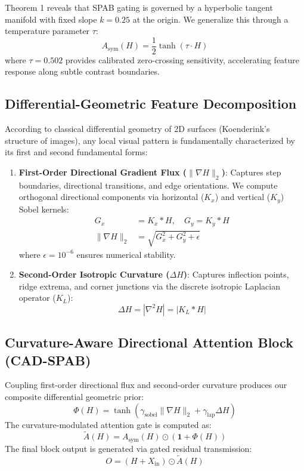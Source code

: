 \documentclass[conference]{IEEEtran}
\begin{document}
Theorem 1 reveals that SPAB gating is governed by a hyperbolic tangent manifold with fixed slope $k = 0.25$ at the origin. We generalize this through a temperature parameter $\tau$:
\begin{equation}
A_{\text{sym}}(H) = \frac{1}{2}\tanh(\tau \cdot H)
\label{eq:temp_sym}
\end{equation}
where $\tau = 0.502$ provides calibrated zero-crossing sensitivity, accelerating feature response along subtle contrast boundaries.

\subsection{Differential-Geometric Feature Decomposition}
According to classical differential geometry of 2D surfaces (Koenderink's structure of images), any local visual pattern is fundamentally characterized by its first and second fundamental forms:
\begin{enumerate}
    \item \textbf{First-Order Directional Gradient Flux ($\|\nabla H\|_2$)}: Captures step boundaries, directional transitions, and edge orientations. We compute orthogonal directional components via horizontal ($K_x$) and vertical ($K_y$) Sobel kernels:
    \begin{align}
    G_x &= K_x * H, \quad G_y = K_y * H \\
    \|\nabla H\|_2 &= \sqrt{G_x^2 + G_y^2 + \epsilon}
    \end{align}
    where $\epsilon = 10^{-6}$ ensures numerical stability.
    \item \textbf{Second-Order Isotropic Curvature ($\Delta H$)}: Captures inflection points, ridge extrema, and corner junctions via the discrete isotropic Laplacian operator ($K_L$):
    \begin{equation}
    \Delta H = |\nabla^2 H| = |K_L * H|
    \end{equation}
\end{enumerate}

\subsection{Curvature-Aware Directional Attention Block (CAD-SPAB)}
Coupling first-order directional flux and second-order curvature produces our composite differential geometric prior:
\begin{equation}
\Phi(H) = \tanh\left(\gamma_{\text{sobel}} \|\nabla H\|_2 + \gamma_{\text{lap}} \Delta H\right)
\end{equation}
The curvature-modulated attention gate is computed as:
\begin{equation}
\widetilde{A}(H) = A_{\text{sym}}(H) \odot \left(\mathbf{1} + \Phi(H)\right)
\end{equation}
The final block output is generated via gated residual transmission:
\begin{equation}
O = (H + X_{\text{in}}) \odot \widetilde{A}(H)
\end{equation}
\end{document}
